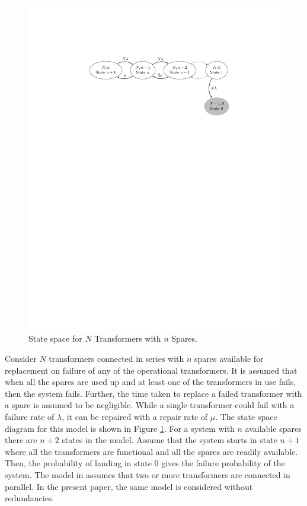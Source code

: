 \documentclass[letterpaper, 12pt]{article}
\begin{document}
\begin{figure}[h!] \centering
  \includegraphics[scale=0.9]{SparesStateSpace}
  \caption{State space for $N$ Transformers with $n$ Spares.\label{fig:SparesStateSpace}} 
\end{figure}

Consider $N$ transformers connected in series with $n$ spares available for replacement on failure of any of the operational transformers. It is assumed that when all the spares are used up and at least one of the transformers in use fails, then the system fails. Further, the time taken to replace a failed transformer with a spare is assumed to be negligible. While a single transformer could fail with a failure rate of $\lambda$, it can be repaired with a repair rate of $\mu$. The state space diagram for this model is shown in Figure \ref{fig:SparesStateSpace}. For a system with $n$ available spares there are $n+2$ states in the model. Assume that the system starts in state $n+1$ where all the transformers are functional and all  the spares are readily available. Then, the probability of landing in state 0 gives the failure probability of the system.
The model in \cite{Silva2010} assumes that two or more transformers are connected in parallel. In the present paper, the same model is considered without redundancies.
\end{document}
